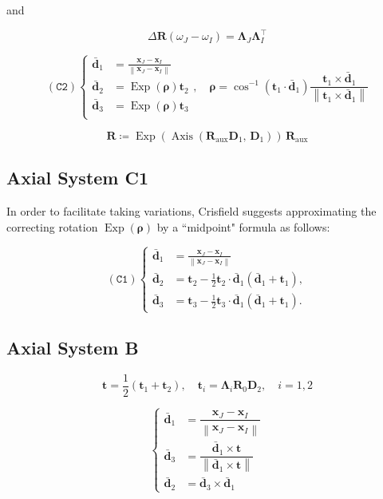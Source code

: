 and

$$
\Delta \bm{R}(\omega_J-\omega_I)=\bm{\Lambda}_J \bm{\Lambda}_I^{\top}
$$


$$
(\texttt{C2})\left\{\begin{aligned}
\bar{\mathbf{d}}_1 &= \frac{\bm{x}_J-\bm{x}_I}{\left\|\bm{x}_J-\bm{x}_I\right\|} \\
\bar{\mathbf{d}}_2 &=  \operatorname{Exp}(\bm{\rho}) \mathbf{t}_2 \\
\bar{\mathbf{d}}_3 &=  \operatorname{Exp}(\bm{\rho}) \mathbf{t}_3 \\
\end{aligned}\right.
, \quad \bm{\rho} =\cos^{-1}\left(\mathbf{t}_1 \cdot \bar{\mathbf{d}}_1\right) \frac{\mathbf{t}_1 \times \bar{\mathbf{d}}_1}{\left\|\mathbf{t}_1 \times \bar{\mathbf{d}}_1\right\|}
$$

$$
\boxed{
\bm{R} \coloneq \operatorname{Exp}(\operatorname{Axis}(\bm{R}_{\mathrm{aux}}\mathbf{D}_1,\, \mathbf{D}_1)) \, \bm{R}_{\mathrm{aux}}
}
$$

\subsection{Axial System C1}

In order to facilitate taking variations, Crisfield suggests approximating the 
correcting rotation $\operatorname{Exp}(\bm{\rho})$ by a ``midpoint" formula as follows:

$$
(\texttt{C1})\left\{\begin{aligned}
\bar{\mathbf{d}}_1 &= \frac{\bm{x}_J-\bm{x}_I}{\left\|\bm{x}_J-\bm{x}_I\right\|} \\
\bar{\mathbf{d}}_2 &= \mathbf{t}_2 - \frac{1}{2} \mathbf{t}_2 \cdot \bar{\mathbf{d}}_1  \left(\bar{\mathbf{d}}_1+\mathbf{t}_1\right), \\
\bar{\mathbf{d}}_3 &= \mathbf{t}_3 - \frac{1}{2} \mathbf{t}_3 \cdot \bar{\mathbf{d}}_1  \left(\bar{\mathbf{d}}_1+\mathbf{t}_1\right) .
\end{aligned}\right.
$$


\subsection{Axial System B}


$$
\mathbf{t}=\frac{1}{2}\left(\mathbf{t}_1+\mathbf{t}_2\right), \quad \mathbf{t}_i=\bm{\Lambda}_i \bm{R}_0 \mathbf{D}_2, \quad i=1,2
$$

$$
\begin{cases}
\bar{\mathbf{d}}_{1} & =\dfrac{\bm{x}_J-\bm{x}_I}{\left\|\bm{x}_J-\bm{x}_I\right\|} \\
\bar{\mathbf{d}}_{3} & =\dfrac{\bar{\mathbf{d}}_1 \times \mathbf{t}}{\left\|\bar{\mathbf{d}}_1 \times \mathbf{t}\right\|}  \\
\bar{\mathbf{d}}_{2} & = \bar{\mathbf{d}}_{3} \times  \bar{\mathbf{d}}_1
\end{cases}
$$

